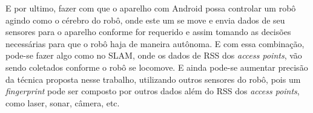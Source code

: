   E por ultimo, fazer com que o aparelho com Android possa controlar 
  um robô agindo como o cérebro do robô, onde este um
  se move e envia dados de seu sensores para o aparelho conforme for 
  requerido e assim tomando as decisões necessárias para
  que o robô haja de maneira autônoma. E com essa combinação, pode-se fazer algo como no SLAM, 
  onde os dados de RSS dos \textit{access points}, vão sendo coletados conforme o robô se locomove.
  E ainda pode-se aumentar precisão da técnica proposta nesse trabalho, utilizando 
  outros sensores do robô, pois um \textit{fingerprint} pode ser composto por outros dados
   além do RSS dos \textit{access points}, como laser, sonar, câmera, etc.
\begin{comment}
    As possibilidades de trabalhos futuros são enormes. Primeiro poderia implantar o modelo de propagação
de sinal, proposto no artigo \cite{wifiRadar}. Nele são levados em consideração
diversas variáveis para sua elaboração, sendo que a mais importante delas é a quantidade de obstáculos que estão 
entre o transmissor de sinal (Access Point) e o receptor (terminal móvel).
Com base nesse parâmetro, uma equação da distância em função da força de sinal recebido
poderá ser deduzida, que será útil para os cálculos da posição e rastreamento
do terminal móvel. Ou ainda combinar técnicas baseadas em RSS com as tecnologias já largamente empregadas, tais como o GPS.
    
    
    Poderia também, ao contrário do sistema proposto, tratar a possibilidade de não haver um mapa do ambiente, e utilizar técnicas que lidam com o SLAM, 
    como nos artigos \cite{construcaoMapas2}\cite{construcaoMapas}\cite{slam}. E utilizar um algoritmo de planejamento de trajetos mais robusto 
    como o proposto em \cite{voronoi}, que utiliza diagrama de Voronoi para criar um \textit{roadmap}. E ainda ao invés de usar um simples sonar para detectar
     obstáculos, utilizar a câmera do tablet.
     
     Podemos aumentar a escala e ao invés de utilizar um simples robô de 40 cm dentro de um prédio, utilizar o sistema de navegação em um carro, 
      em um ambiente maior \cite{googleCar}.
\end{comment}
